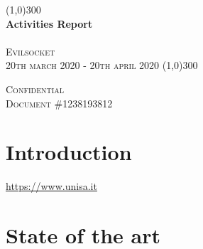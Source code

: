 \documentclass{article}
\begin{document}


\begin{titlepage}

    \begin{center}
        \line(1,0){300} \\ 
        
        \huge{\bfseries Activities Report}\\
        \textsc{\normalsize \\Evilsocket \\20th march 2020 - 20th april 2020}
        \line(1,0){300} \\ 
    \end{center}

    \vspace{10cm}

    \begin{flushright}
       \textsc{\normalsize Confidential\\Document \#1238193812} 
    \end{flushright}
    
\end{titlepage}

\tableofcontents

\section{Introduction}\label{sec:intro}
\url{https://www.unisa.it}

\section{State of the art}\label{sec:soa}
\end{document}
